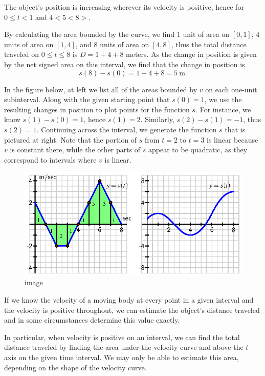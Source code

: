 The object's position is increasing wherever its velocity is positive,
hence for \(0 \le t < 1\) and \(4 < 5 < 8>\).

By calculating the area bounded by the curve, we find 1 unit of area on
\([0,1]\), 4 units of area on \([1,4]\), and 8 units of area on
\([4,8]\), thus the total distance traveled on \(0 \le t \le 8\) is
\(D = 1 + 4 + 8\) meters. As the change in position is given by the net
signed area on this interval, we find that the change in position is
\[s(8) - s(0) = 1 - 4 + 8 = 5 \ \mbox{m}.\]

In the figure below, at left we list all of the areas bounded by \(v\)
on each one-unit subinterval. Along with the given starting point that
\(s(0) = 1\), we use the resulting changes in position to plot points
for the function \(s\). For instance, we know \(s(1) - s(0) = 1\), hence
\(s(1) = 2\). Similarly, \(s(2) - s(1) = -1\), thus \(s(2) = 1\).
Continuing across the interval, we generate the function \(s\) that is
pictured at right. Note that the portion of \(s\) from \(t = 2\) to
\(t = 3\) is linear because \(v\) is constant there, while the other
parts of \(s\) appear to be quadratic, as they correspond to intervals
where \(v\) is linear.

\begin{figure}[htbp]
\centering
\includegraphics{figures/4_1_Act3Soln.eps}
\caption{image}
\end{figure}

If we know the velocity of a moving body at every point in a given
interval and the velocity is positive throughout, we can estimate the
object's distance traveled and in some circumstances determine this
value exactly.

In particular, when velocity is positive on an interval, we can find the
total distance traveled by finding the area under the velocity curve and
above the \(t\)-axis on the given time interval. We may only be able to
estimate this area, depending on the shape of the velocity curve.

